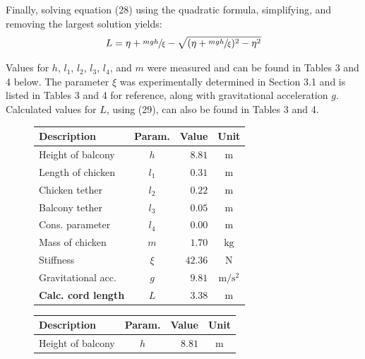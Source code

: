 \documentclass[a4paper]{article}
\begin{document}
Finally, solving equation (28) using the quadratic formula, simplifying, and removing the largest solution yields:
\begin{equation}
L = \eta +\sfrac{mgh}{\xi} - \sqrt{(\eta + \sfrac{mgh}{\xi})^2 - \eta^2}
\end{equation}

Values for $h$, $l_1$, $l_2$, $l_3$, $l_4$, and $m$ were measured and can be found in Tables 3 and 4 below. The parameter $\xi$ was experimentally determined in Section 3.1 and is listed in Tables 3 and 4 for reference, along with gravitational acceleration $g$. Calculated values for $L$, using (29), can also be found in Tables 3 and 4.\\
\begin{figure}
	\centering
	\begin{minipage}[t]{0.45\textwidth}
		\centering
		\small
		\begin{tabular}{lcrc}
			\toprule
			Description & Param. & Value & Unit\\
			\midrule
			Height of balcony & $h$ & $8.81$ & $\si{\meter}$ \\
			Length of chicken & $l_1$ & $0.31$ & $\si{\meter}$ \\
			Chicken tether & $l_2$ & $0.22$ & $\si{\meter}$ \\
			Balcony tether & $l_3$ & $0.05$ & $\si{\meter}$ \\
			Cons. parameter & $l_4$ & $0.00$ & $\si{\meter}$ \\
			Mass of chicken & $m$ & $1.70$ & $\si{\kilogram}$ \\
			Stiffness & $\xi$ & $42.36$ & $\si{\newton}$ \\
			Gravitational acc. & $g$ & $9.81$ & $\si{\meter\per\second^2}$ \\
			\midrule
			\textbf{Calc. cord length} & $L$ & $3.38$ & $\si{\meter}$\\
			\bottomrule
		\end{tabular}
	\end{minipage}
	\hspace{0.75cm}
	\begin{minipage}[t]{0.45\textwidth}
		\centering
		\small
		\begin{tabular}{lcrc}
			\toprule
			Description & Param. & Value & Unit\\
			\midrule
			Height of balcony & $h$ & $8.81$ & $\si{\meter}$ \\

\end{tabular}
\end{minipage}
\end{figure}
\end{document}
